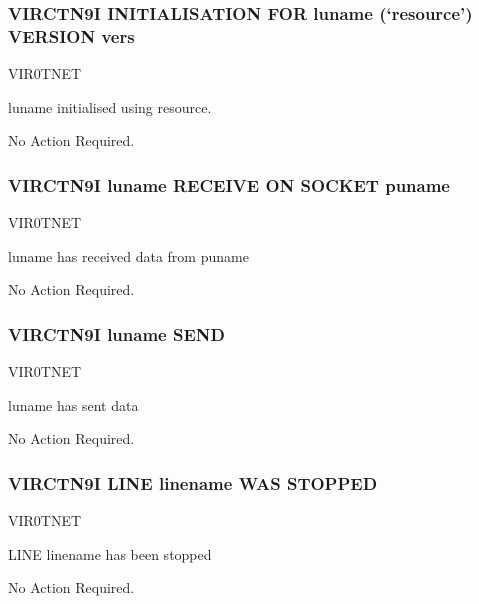 \documentclass[letterpaper,10pt,english]{sphinxmanual}
\begin{document}
\subsubsection{VIRCTN9I INITIALISATION FOR luname (‘resource’) VERSION vers}
\label{\detokenize{messages:virctn9i-initialisation-for-luname-resource-version-vers}}\begin{description}
\sphinxAtStartPar
VIR0TNET

\sphinxAtStartPar
luname initialised using resource.

\sphinxAtStartPar
No Action Required.

\end{description}


\subsubsection{VIRCTN9I luname RECEIVE ON SOCKET puname}
\label{\detokenize{messages:virctn9i-luname-receive-on-socket-puname}}\begin{description}
\sphinxAtStartPar
VIR0TNET

\sphinxAtStartPar
luname has received data from puname

\sphinxAtStartPar
No Action Required.

\end{description}


\subsubsection{VIRCTN9I luname SEND}
\label{\detokenize{messages:virctn9i-luname-send}}\begin{description}
\sphinxAtStartPar
VIR0TNET

\sphinxAtStartPar
luname has sent data

\sphinxAtStartPar
No Action Required.

\end{description}


\subsubsection{VIRCTN9I LINE linename WAS STOPPED}
\label{\detokenize{messages:virctn9i-line-linename-was-stopped}}\begin{description}
\sphinxAtStartPar
VIR0TNET

\sphinxAtStartPar
LINE linename has been stopped

\sphinxAtStartPar
No Action Required.

\end{description}
\end{document}
